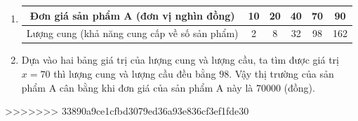 \begin{ex}
{\begin{enumerate}
    $$
    T=\{338 ; 288 ; 200 ; 98 ; 50\} .
    $$
    \item
    \begin{tabular}{|c|c|c|c|c|c|}
        \hline Đơn giá sản phẩm A (đơn vị nghìn đồng) & 10 & 20 & 40 & 70 & 90 \\
        \hline Lượng cung (khả năng cung cấp về số sản phẩm) & 2 & 8 & 32 & 98 & 162 \\
        \hline
    \end{tabular}
    \item Dựa vào hai bảng giá trị của lượng cung và lượng cầu, ta tìm được giá trị $x=70$ thì lượng cung và lượng cầu đều bằng $98$. Vậy thị trường của sản phẩm A cân bằng khi đơn giá của sản phẩm A này là $70000$ (đồng).
\end{enumerate}
}
\end{ex}
>>>>>>> 33890a9ce1cfbd3079ed36a93e836cf3ef1fde30

